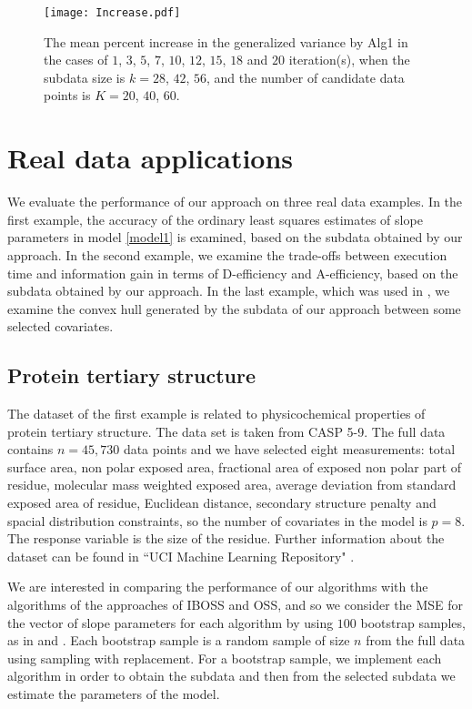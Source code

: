 \documentclass[12pt]{article}
\theoremstyle{definition}
\begin{document}
	\begin{figure}[!thb]
		\centering
		\texttt{[image: Increase.pdf]}
		\caption{The mean percent increase in the generalized variance by Alg1 in the cases of $1$, $3$, $5$, $7$, $10$, $12$, $15$, $18$ and $20$ iteration(s), when the subdata size is  $k=28$, $42$, $56$, and the number of candidate data points is $K=20$, $40$, $60$.}
		\label{figiter}
	\end{figure}
	
	
	
	\section{Real data applications}
	\label{section_data}
	
	We evaluate the performance of our approach on three real data examples. In the first example, the accuracy of the ordinary least squares estimates of slope parameters in model \eqref{model1} is examined, based on the subdata obtained by our approach. In the second example, we examine the trade-offs between execution time and information gain in terms of D-efficiency and A-efficiency, based on the subdata obtained by our approach. In the last example, which was used in \cite{wang2019information}, we
	examine the convex hull generated by the subdata of our approach between some selected covariates.
	
	\subsection{Protein tertiary structure}
	The dataset of the first example is related to physicochemical properties of protein tertiary structure. The data set is taken from CASP 5-9. The full data contains $n=45, 730$ data points and we have selected eight measurements: total surface area, non polar exposed area, fractional area of exposed non polar part of residue, molecular mass weighted exposed area, average deviation from standard exposed area of residue, Euclidean distance, secondary structure penalty and spacial distribution constraints, so the number of covariates in the model is $p=8$. The response variable is the size of the residue. Further information about the dataset can be found in ``UCI Machine Learning Repository" \cite{dua2019}.
	
	We are interested in comparing the performance of our algorithms with the algorithms of the approaches of IBOSS and OSS, and so we consider the MSE for the vector of slope parameters for each algorithm by using $100$ bootstrap samples, as in \cite{wang2019information} and \cite{wang2021oss}. Each bootstrap sample is a random sample of size $n$ from the full data using sampling with replacement. For a bootstrap sample, we implement each algorithm in order to obtain the subdata and then from the selected subdata we estimate the parameters of the model. 
	
\end{document}
